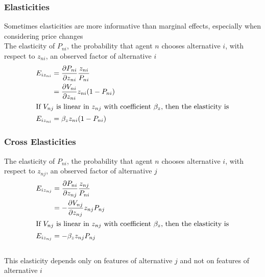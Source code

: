 \documentclass{beamer}\usepackage[]{graphicx}\usepackage[]{color}
\begin{document}
\begin{frame}\frametitle{Elasticities}
    Sometimes elasticities are more informative than marginal effects, especially when considering price changes \\
    \vspace{3ex}
    The elasticity of $P_{ni}$, the probability that agent $n$ chooses alternative $i$, with respect to $z_{ni}$, an observed factor of alternative $i$
    \begin{align*}
    	E_{iz_{ni}} &= \frac{\partial P_{ni}}{\partial z_{ni}} \frac{z_{ni}}{P_{ni}} \\
    	&= \frac{\partial V_{ni}}{\partial z_{ni}} z_{ni} (1 - P_{ni}) \\
    	\intertext{If $V_{nj}$ is linear in $z_{nj}$ with coefficient $\beta_z$, then the elasticity is}
    	E_{iz_{ni}} &= \beta_z z_{ni} (1 - P_{ni})
    \end{align*}
\end{frame}

\begin{frame}\frametitle{Cross Elasticities}
    The elasticity of $P_{ni}$, the probability that agent $n$ chooses alternative $i$, with respect to $z_{nj}$, an observed factor of alternative $j$
    \begin{align*}
    	E_{iz_{nj}} &= \frac{\partial P_{ni}}{\partial z_{nj}} \frac{z_{nj}}{P_{ni}} \\
    	&= -\frac{\partial V_{nj}}{\partial z_{nj}} z_{nj} P_{nj} \\
    	\intertext{If $V_{nj}$ is linear in $z_{nj}$ with coefficient $\beta_z$, then the elasticity is}
    	E_{iz_{nj}} &= -\beta_z z_{nj} P_{nj}
    \end{align*} \\
    \vspace{1ex}
    This elasticity depends only on features of alternative $j$ and not on features of alternative $i$
\end{frame}
\end{document}

